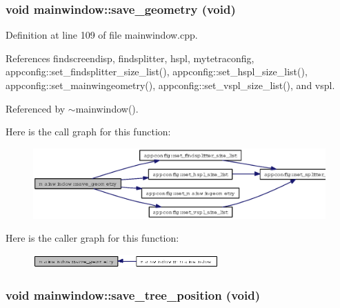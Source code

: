 \subsubsection{\setlength{\rightskip}{0pt plus 5cm}void mainwindow::save\_\-geometry (void)\hspace{0.3cm}{\tt  [private]}}\label{classmainwindow_129c1ed40a92e5bbc43a7af90575ab6c}




Definition at line 109 of file mainwindow.cpp.

References findscreendisp, findsplitter, hspl, mytetraconfig, appconfig::set\_\-findsplitter\_\-size\_\-list(), appconfig::set\_\-hspl\_\-size\_\-list(), appconfig::set\_\-mainwingeometry(), appconfig::set\_\-vspl\_\-size\_\-list(), and vspl.

Referenced by $\sim$mainwindow().

Here is the call graph for this function:\begin{figure}[H]
\begin{center}
\leavevmode
\includegraphics[width=324pt]{classmainwindow_129c1ed40a92e5bbc43a7af90575ab6c_cgraph}
\end{center}
\end{figure}


Here is the caller graph for this function:\begin{figure}[H]
\begin{center}
\leavevmode
\includegraphics[width=202pt]{classmainwindow_129c1ed40a92e5bbc43a7af90575ab6c_icgraph}
\end{center}
\end{figure}
\subsubsection{\setlength{\rightskip}{0pt plus 5cm}void mainwindow::save\_\-tree\_\-position (void)\hspace{0.3cm}{\tt  [private]}}\label{classmainwindow_aa0957056623adcd87ea0d28c2e9f671}





